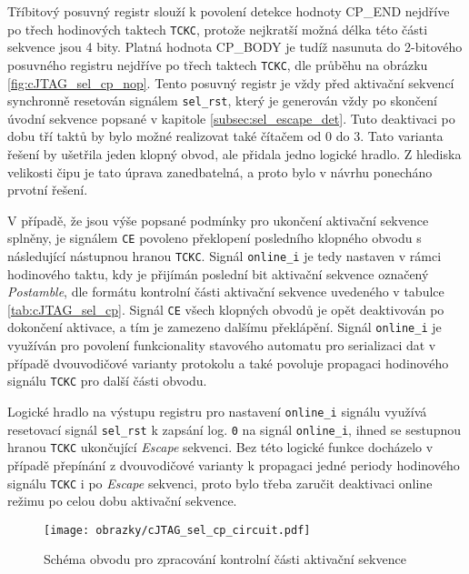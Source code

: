 Tříbitový posuvný registr slouží k povolení detekce hodnoty CP\_END nejdříve po třech hodinových taktech \texttt{\acs{TCKC}}, protože nejkratší možná délka této části sekvence jsou 4 bity. Platná hodnota CP\_BODY je tudíž nasunuta do 2-bitového posuvného registru nejdříve po třech taktech \texttt{\acs{TCKC}}, dle průběhu na obrázku \ref{fig:cJTAG_sel_cp_nop}. Tento posuvný registr je vždy před aktivační sekvencí synchronně resetován signálem \texttt{sel\_rst}, který je generován vždy po skončení úvodní sekvence popsané v kapitole \ref{subsec:sel_escape_det}. Tuto deaktivaci po dobu tří taktů by bylo možné realizovat také čítačem od 0 do 3. Tato varianta řešení by ušetřila jeden klopný obvod, ale přidala jedno logické hradlo. Z hlediska velikosti čipu je tato úprava zanedbatelná, a proto bylo v návrhu ponecháno prvotní řešení.

V případě, že jsou výše popsané podmínky pro ukončení aktivační sekvence splněny, je signálem \texttt{CE} povoleno překlopení posledního klopného obvodu s následující nástupnou hranou \texttt{\acs{TCKC}}. Signál \texttt{online\_i} je tedy nastaven v rámci hodinového taktu, kdy je přijímán poslední bit aktivační sekvence označený \textit{Postamble}, dle formátu kontrolní části aktivační sekvence uvedeného v tabulce \ref{tab:cJTAG_sel_cp}. Signál \texttt{CE} všech klopných obvodů je opět deaktivován po dokončení aktivace, a tím je zamezeno dalšímu překlápění. Signál \texttt{online\_i} je využíván pro povolení funkcionality stavového automatu pro serializaci dat v případě dvouvodičové varianty protokolu a také povoluje propagaci hodinového signálu \texttt{\acs{TCKC}} pro další části obvodu. 

Logické hradlo na výstupu registru pro nastavení \texttt{online\_i} signálu využívá resetovací signál \texttt{sel\_rst} k zapsání log. \texttt{0} na signál \texttt{online\_i}, ihned se sestupnou hranou \texttt{\acs{TCKC}} ukončující \textit{Escape} sekvenci. Bez této logické funkce docházelo v případě přepínání z dvouvodičové varianty k propagaci jedné periody hodinového signálu \texttt{\acs{TCKC}} i po \textit{Escape} sekvenci, proto bylo třeba zaručit deaktivaci online režimu po celou dobu aktivační sekvence.

\begin{figure}[H]
  \begin{center}
    \texttt{[image: obrazky/cJTAG\_sel\_cp\_circuit.pdf]}
  \end{center}
  \caption{Schéma obvodu pro zpracování kontrolní části aktivační sekvence}
	\label{fig:cJTAG_sel_cp_circuit}
\end{figure}

